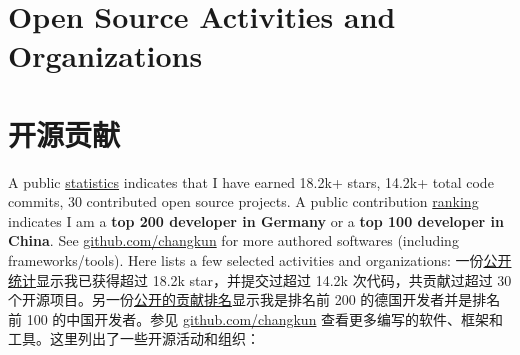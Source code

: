  {
  \section{\textbf{Open Source Activities and Organizations}}
}{
  \section{\textbf{开源贡献}}
}
\small
{} {
  A public \href{https://github-readme-stats.vercel.app/api?username=changkun&include_all_commits=true}{statistics} indicates that I have earned 18.2k+ stars, 14.2k+ total code commits, 30 contributed open source projects. A public contribution \href{https://github.com/gayanvoice/top-github-users/blob/858980e5cb10d1b4c27a24d36ae6547aa0f195cd/markdown/public_contributions/germany.md}{ranking} indicates I am a \textbf{top 200 developer in Germany} or a \textbf{top 100 developer in China}. See \href{https://github.com/changkun}{github.com/changkun} for more authored softwares (including frameworks/tools). Here lists a few selected activities and organizations:
}{
  一份\href{https://github-readme-stats.vercel.app/api?username=changkun&include_all_commits=true}{公开统计}显示我已获得超过 18.2k star，并提交过超过 14.2k 次代码，共贡献过超过 30 个开源项目。另一份\href{https://github.com/gayanvoice/top-github-users/blob/858980e5cb10d1b4c27a24d36ae6547aa0f195cd/markdown/public_contributions/germany.md}{公开的贡献排名}显示我是排名前 200 的德国开发者并是排名前 100 的中国开发者。参见 \href{https://github.com/changkun}{github.com/changkun} 查看更多编写的软件、框架和工具。这里列出了一些开源活动和组织：
}
